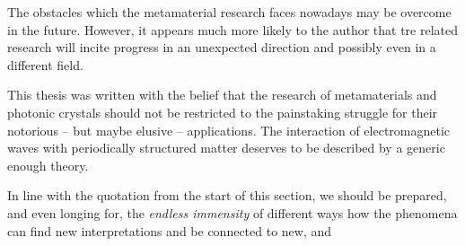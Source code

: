 The obstacles which the metamaterial research faces nowadays may be overcome in the future. However, it appears much more likely to the author that tre related research will incite progress in an unexpected direction and possibly even in a different field.

This thesis was written with the belief that the research of metamaterials and photonic crystals should not be restricted to the painstaking struggle for their notorious -- but maybe elusive -- applications. The interaction of electromagnetic waves with periodically structured matter deserves to be %
described by a generic enough theory.

In line with the quotation from the start of this section, we should be prepared, and even longing for, the \textit{endless immensity} of different 
ways how the phenomena can find new interpretations and be connected to new, and 



